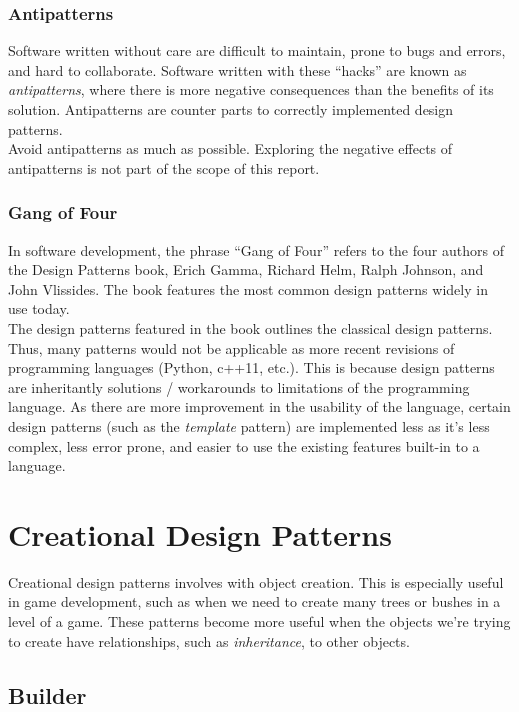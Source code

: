 \documentclass[10pt,letterpaper]{article}
\newcommand{\bs}{\bigskip}
\begin{document}
\begin{multicols}{2}
\subsubsection{Antipatterns}
Software written without care are difficult to maintain, prone to bugs and errors, and hard to collaborate. Software written with these ``hacks'' are known as \textit{antipatterns}, where there is more negative consequences than the benefits of its solution. Antipatterns are counter parts to correctly implemented design patterns.\cite{sm-antipatterns}\bs
\\
Avoid antipatterns as much as possible. Exploring the negative effects of antipatterns is not part of the scope of this report.

\subsubsection{Gang of Four}

In software development, the phrase ``Gang of Four'' refers to the four authors of the Design Patterns book, Erich Gamma, Richard Helm, Ralph Johnson, and John Vlissides\cite{gof-wiki}. The book features the most common design patterns widely in use today.\bs
\\
The design patterns featured in the book outlines the classical design patterns. Thus, many patterns would not be applicable as more recent revisions of programming languages (Python, c++11, etc.). This is because design patterns are inheritantly solutions / workarounds to limitations of the programming language. As there are more improvement in the usability of the language, certain design patterns (such as the \textit{template} pattern) are implemented less as it's less complex, less error prone, and easier to use the existing features built-in to a language.


\section{Creational Design Patterns}

Creational design patterns involves with object creation.\cite{sm-creationaldp} This is especially useful in game development, such as when we need to create many trees or bushes in a level of a game. These patterns become more useful when the objects we're trying to create have relationships, such as \textit{inheritance}, to other objects.

\subsection{Builder}


\end{multicols}
\end{document}
